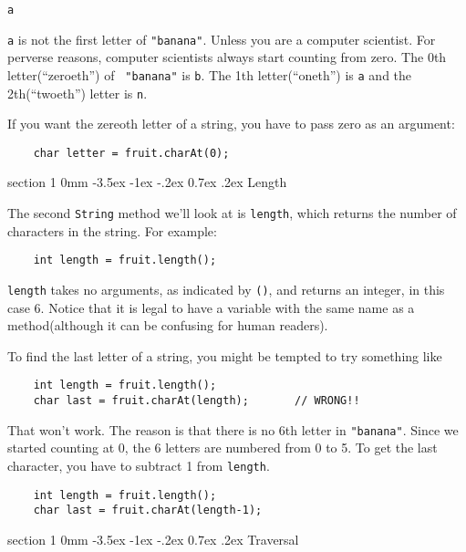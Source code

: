 \documentclass{book}
\makeatletter
\renewcommand{\section}{\@startsection 
    {section} {1} {0mm}%
    {-3.5ex \@plus -1ex \@minus -.2ex}%
    {0.7ex \@plus.2ex}%
    {\normalfont\Large\bfseries}}
\makeatother
\begin{document}
\begin{verbatim}
a
\end{verbatim}
%
{\tt a} is not the first letter of {\tt "banana"}.  Unless you are a
computer scientist.  For perverse reasons, computer scientists always
start counting from zero.  The 0th letter(``zeroeth'') of {\tt
"banana"} is {\tt b}.  The 1th letter(``oneth'') is {\tt a} and the
2th(``twoeth'') letter is {\tt n}.

If you want the zereoth letter of a string, you have to pass
zero as an argument:

\begin{verbatim}
    char letter = fruit.charAt(0);
\end{verbatim}

\section{Length}

The second {\tt String} method we'll look at is {\tt length}, which
returns the number of characters in the string.  For example:

\begin{verbatim}
    int length = fruit.length();
\end{verbatim}
%
{\tt length} takes no arguments, as indicated by {\tt()},
and returns an integer, in this case 6.  Notice that it is
legal to have a variable with the same name as a method(although
it can be confusing for human readers).

To find the last letter of a string, you might be tempted to
try something like

\begin{verbatim}
    int length = fruit.length();
    char last = fruit.charAt(length);       // WRONG!!
\end{verbatim}
%
That won't work.  The reason is that there is no 6th letter
in {\tt "banana"}.  Since we started counting at 0, the 6
letters are numbered from 0 to 5.  To get the last character,
you have to subtract 1 from {\tt length}.

\begin{verbatim}
    int length = fruit.length();
    char last = fruit.charAt(length-1);
\end{verbatim}


\section{Traversal}
\label{traverse}
\end{document}

